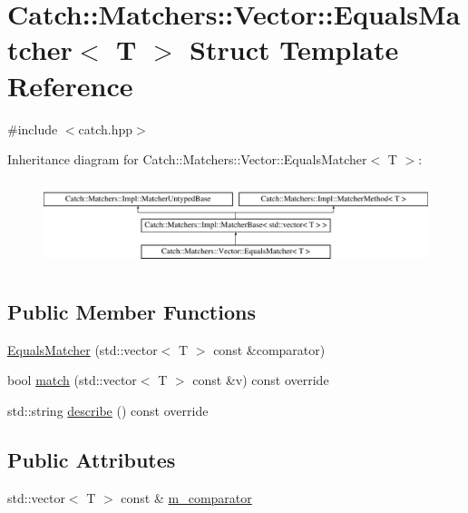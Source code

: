 \hypertarget{struct_catch_1_1_matchers_1_1_vector_1_1_equals_matcher}{}\section{Catch\+:\+:Matchers\+:\+:Vector\+:\+:Equals\+Matcher$<$ T $>$ Struct Template Reference}
\label{struct_catch_1_1_matchers_1_1_vector_1_1_equals_matcher}


{\ttfamily \#include $<$catch.\+hpp$>$}

Inheritance diagram for Catch\+:\+:Matchers\+:\+:Vector\+:\+:Equals\+Matcher$<$ T $>$\+:\begin{figure}[H]
\begin{center}
\leavevmode
\includegraphics[height=2.514970cm]{struct_catch_1_1_matchers_1_1_vector_1_1_equals_matcher}
\end{center}
\end{figure}
\subsection*{Public Member Functions}
\begin{DoxyCompactItemize}
\item 
\mbox{\hyperlink{struct_catch_1_1_matchers_1_1_vector_1_1_equals_matcher_a3846c47780d1991dcfe87aefded98008}{Equals\+Matcher}} (std\+::vector$<$ T $>$ const \&comparator)
\item 
bool \mbox{\hyperlink{struct_catch_1_1_matchers_1_1_vector_1_1_equals_matcher_a2d96cca58a44151fddc5257eda3305da}{match}} (std\+::vector$<$ T $>$ const \&v) const override
\item 
std\+::string \mbox{\hyperlink{struct_catch_1_1_matchers_1_1_vector_1_1_equals_matcher_a36b5f7ecada4081d6c65bebe8ddea6f4}{describe}} () const override
\end{DoxyCompactItemize}
\subsection*{Public Attributes}
\begin{DoxyCompactItemize}
\item 
std\+::vector$<$ T $>$ const  \& \mbox{\hyperlink{struct_catch_1_1_matchers_1_1_vector_1_1_equals_matcher_a56f7aa6f110a12b1b9aeb0cabbc9d755}{m\+\_\+comparator}}
\end{DoxyCompactItemize}
